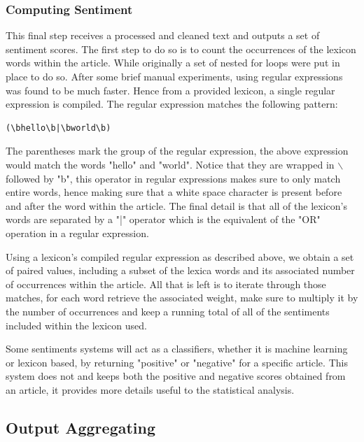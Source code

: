 \subsubsection{Computing Sentiment}

This final step receives a processed and cleaned text and outputs a set of sentiment scores. The first step to do so is to count the occurrences of the lexicon words within the article. While originally a set of nested for loops were put in place to do so. After some brief manual experiments, using regular expressions was found to be much faster. Hence from a provided lexicon, a single regular expression is compiled. The regular expression matches the following pattern:
\begin{center}
\begin{verbatim}(\bhello\b|\bworld\b)\end{verbatim}
\end{center}

The parentheses mark the group of the regular expression, the above expression would match the words "hello" and "world". Notice that they are wrapped in $\backslash$ followed by "b", this operator in regular expressions makes sure to only match entire words, hence making sure that a white space character is present before and after the word within the article. The final detail is that all of the lexicon's words are separated by a "|" operator which is the equivalent of the "OR" operation in a regular expression.

Using a lexicon's compiled regular expression as described above, we obtain a set of paired values, including a subset of the lexica words and its associated number of occurrences within the article.
All that is left is to iterate through those matches, for each word retrieve the associated weight, make sure to multiply it by the number of occurrences and keep a running total of all of the sentiments included within the lexicon used.

Some sentiments systems will act as a classifiers, whether it is machine learning or lexicon based, by returning "positive" or "negative" for a specific article. This system does not and keeps both the positive and negative scores obtained from an article, it provides more details useful to the statistical analysis.

\subsection{Output Aggregating}\label{chap: output aggregating}

